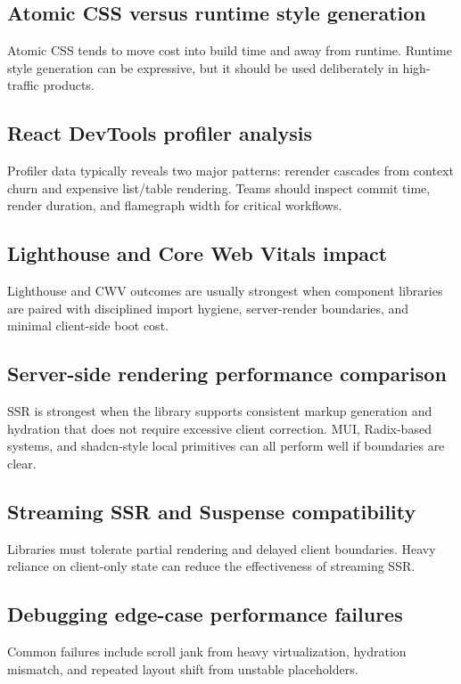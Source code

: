 \subsection{Atomic CSS versus runtime style generation}
Atomic CSS tends to move cost into build time and away from runtime. Runtime style generation can be expressive, but it should be used deliberately in high-traffic products.

\subsection{React DevTools profiler analysis}
Profiler data typically reveals two major patterns: rerender cascades from context churn and expensive list/table rendering. Teams should inspect commit time, render duration, and flamegraph width for critical workflows.

\subsection{Lighthouse and Core Web Vitals impact}
Lighthouse and CWV outcomes are usually strongest when component libraries are paired with disciplined import hygiene, server-render boundaries, and minimal client-side boot cost.

\subsection{Server-side rendering performance comparison}
SSR is strongest when the library supports consistent markup generation and hydration that does not require excessive client correction. MUI, Radix-based systems, and shadcn-style local primitives can all perform well if boundaries are clear.

\subsection{Streaming SSR and Suspense compatibility}
Libraries must tolerate partial rendering and delayed client boundaries. Heavy reliance on client-only state can reduce the effectiveness of streaming SSR.

\subsection{Debugging edge-case performance failures}
Common failures include scroll jank from heavy virtualization, hydration mismatch, and repeated layout shift from unstable placeholders.

